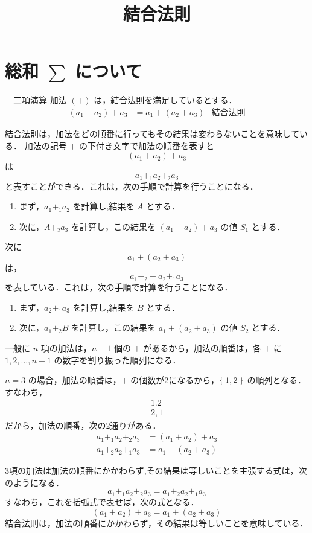 \documentclass[leqno,autodetect-engine, dvipdfmx-if-dvi,ja=standard]{bxjsarticle}
\title{結合法則}
\begin{document}
	\section{総和 $\sum$ について}

	\begin{dfn}　二項演算 加法 $(+)$ は，結合法則を満足しているとする．
		\begin{align}
			(a_1 + a_2) + a_3 &= a_1 + (a_2 + a_3)  & \text{結合法則}
		\end{align}
	\end{dfn}

	結合法則は，加法をどの順番に行ってもその結果は変わらないことを意味している．
	加法の記号 $+$ の下付き文字で加法の順番を表すと
	\[
	(a_1 + a_2) + a_3
	\]
	は
	\[
	a_1 +_1 a_2 +_2 a_3
	\]
	と表すことができる．これは，次の手順で計算を行うことになる．
	\begin{enumerate}
		\item まず，$a_1 +_1 a_2$ を計算し,結果を $A$ とする．
		\item 次に，$A +_2 a_3$ を計算し，この結果を $(a_1 + a_2) + a_3$ の値 $S_1$ とする．
	\end{enumerate}

	次に
	\[
	a_1 + (a_2 + a_3)
	\]
	は，
	\[
	a_1 +_2 + a_2 +_1 a_3
	\]
	を表している．これは，次の手順で計算を行うことになる．
	\begin{enumerate}
		\item まず，$a_2 +_1 a_3$ を計算し,結果を $B$ とする．
		\item 次に，$a_1 +_2 B$ を計算し，この結果を $a_1 + (a_2 + a_3)$ の値 $S_2$ とする．
	\end{enumerate}

	一般に $n$ 項の加法は，$n-1$ 個の $+$ があるから，加法の順番は，各 $+$ に $1,2,\dots,n-1$ の数字を割り振った順列になる．

	$n=3$ の場合，加法の順番は，$+$ の個数が2になるから，$\Set{1,2}$ の順列となる．すなわち，
	\begin{align}
	 1.2 \\
	 2,1
	\end{align}
	だから，加法の順番，次の2通りがある．
	\begin{align}
		a_1 +_1 a_2 +_2 a_3 &= (a_1 + a_2) + a_3 \\
		a_1 +_2 a_2 +_1 a_3 &= a_1 + (a_2 + a_3)
	\end{align}

	3項の加法は加法の順番にかかわらず,その結果は等しいことを主張する式は，次のようになる．
	\[
		a_1 +_1 a_2 +_2 a_3 = a_1 +_2 a_2 +_1 a_3
	\]
	すなわち，これを括弧式で表せば，次の式となる．
	\[
		(a_1 + a_2) + a_3 = a_1 + (a_2 + a_3)
	\]
	結合法則は，加法の順番にかかわらず，その結果は等しいことを意味している．
\end{document}
